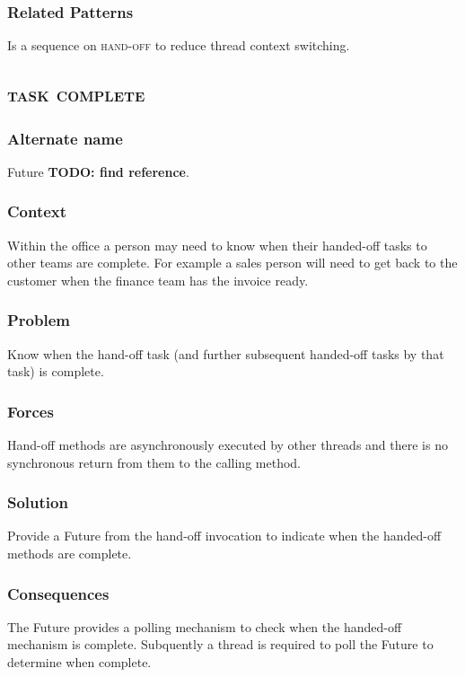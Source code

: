 \documentclass[prodmode]{style/acmlarge}
\begin{document}
\subsubsection*{Related Patterns} Is a sequence on \textsc{hand-off} to reduce
thread context switching.



\subsection{\textsc{\textbf{task complete}}}

\subsubsection*{Alternate name} Future \textbf{TODO: find reference}.

\subsubsection*{Context} Within the office a person may need to know when their
handed-off tasks to other teams are complete.  For example a sales person will
need to get back to the customer when the finance team has the invoice ready.

\subsubsection*{Problem} Know when the hand-off task (and further subsequent
handed-off tasks by that task) is complete.

\subsubsection*{Forces} Hand-off methods are asynchronously executed by other
threads and there is no synchronous return from them to the calling method.

\subsubsection*{Solution} Provide a Future from the hand-off invocation to
indicate when the handed-off methods are complete.

\subsubsection*{Consequences} The Future provides a polling mechanism to check
when the handed-off mechanism is complete.  Subquently a thread is required to
poll the Future to determine when complete.
\end{document}

